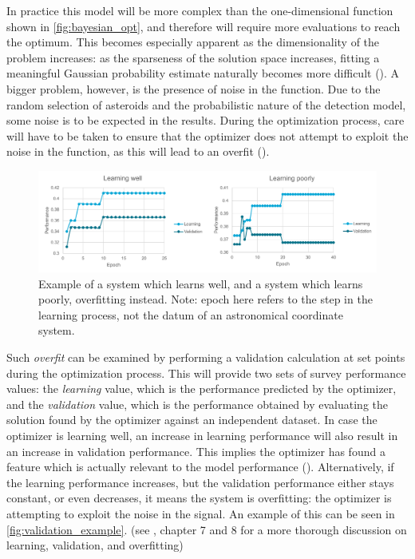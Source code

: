 In practice this model will be more complex than the one-dimensional function shown in \autoref{fig:bayesian_opt}, and therefore will require more evaluations to reach the optimum. This becomes especially apparent as the dimensionality of the problem increases: as the sparseness of the solution space increases, fitting a meaningful Gaussian probability estimate naturally becomes more difficult (\cite{Bayesian}). A bigger problem, however, is the presence of noise in the function. Due to the random selection of asteroids and the probabilistic nature of the detection model, some noise is to be expected in the results. During the optimization process, care will have to be taken to ensure that the optimizer does not attempt to exploit the noise in the function, as this will lead to an overfit (\cite{Surrogate}). \\

\begin{figure}[htbp]
 \centering
 \includegraphics[width=1.0\textwidth]{img/validation_example.pdf}
 \caption{Example of a system which learns well, and a system which learns poorly, overfitting instead. Note: epoch here refers to the step in the learning process, not the datum of an astronomical coordinate system.}
 \label{fig:validation_example}
\end{figure}

Such \textit{overfit} can be examined by performing a validation calculation at set points during the optimization process. This will provide two sets of survey performance values: the \textit{learning} value, which is the performance predicted by the optimizer, and the \textit{validation} value, which is the performance obtained by evaluating the solution found by the optimizer against an independent dataset. In case the optimizer is learning well, an increase in learning performance will also result in an increase in validation performance. This implies the optimizer has found a feature which is actually relevant to the model performance (\cite{DeepLearning}). Alternatively, if the learning performance increases, but the validation performance either stays constant, or even decreases, it means the system is overfitting: the optimizer is attempting to exploit the noise in the signal. An example of this can be seen in \autoref{fig:validation_example}. (see \cite{DeepLearning}, chapter 7 and 8 for a more thorough discussion on learning, validation, and overfitting)\\


